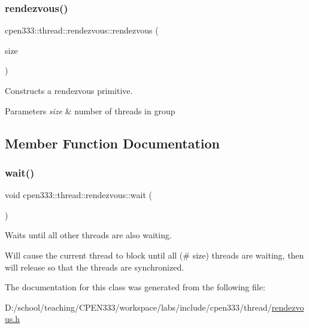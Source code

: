 \subsubsection{\texorpdfstring{rendezvous()}{rendezvous()}}
{\footnotesize\ttfamily cpen333\+::thread\+::rendezvous\+::rendezvous (\begin{DoxyParamCaption}\item[{size\+\_\+t}]{size }\end{DoxyParamCaption})\hspace{0.3cm}{\ttfamily [inline]}}



Constructs a rendezvous primitive. 


\begin{DoxyParams}{Parameters}
{\em size} & number of threads in group \\
\hline
\end{DoxyParams}


\subsection{Member Function Documentation}
\mbox{\label{classcpen333_1_1thread_1_1rendezvous_ad712b180014e24f3b33707726984c365}} 
\subsubsection{\texorpdfstring{wait()}{wait()}}
{\footnotesize\ttfamily void cpen333\+::thread\+::rendezvous\+::wait (\begin{DoxyParamCaption}{ }\end{DoxyParamCaption})\hspace{0.3cm}{\ttfamily [inline]}}



Waits until all other threads are also waiting. 

Will cause the current thread to block until all (\# size) threads are waiting, then will release so that the threads are synchronized. 

The documentation for this class was generated from the following file\+:\begin{DoxyCompactItemize}
\item 
D\+:/school/teaching/\+C\+P\+E\+N333/workspace/labs/include/cpen333/thread/\hyperlink{thread_2rendezvous_8h}{rendezvous.\+h}\end{DoxyCompactItemize}
